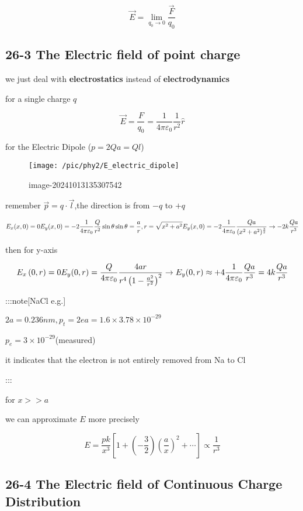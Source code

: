 \documentclass[
]{article}
\begin{document}
\[
\vec E=\lim _{q_0\to 0}\frac{\vec F}{q_0}
\]

\hypertarget{the-electric-field-of-point-charge}{%
\subsection{26-3 The Electric field of point
charge}\label{the-electric-field-of-point-charge}}

we just deal with \textbf{electrostatics} instead of
\textbf{electrodynamics}

for a single charge \(q\)

\[
\vec E=\frac{F}{q_0}=\frac{1}{4\pi \varepsilon  _0}\frac{1}{r^2}\hat r
\]

for the Electric Dipole (\(p=2Qa=Ql\))

\begin{figure}
\centering
\texttt{[image: /pic/phy2/E\_electric\_dipole]}
\caption{image-20241013135307542}
\end{figure}

remember \(\vec p=q\cdot\vec l\),the direction is from \(-q\) to \(+q\)

\[
E_x(x,0)=0\\E_y(x,0)=-2\frac{1}{4\pi \varepsilon _0}\frac{Q}{r^2}\sin \theta\\\sin \theta =\frac{a}{r},r=\sqrt{x^2+a^2}\\E_y(x,0)=-2\frac{1}{4\pi \varepsilon _0} \frac{Qa}{(x^2+a^2)^{\frac{3}{2}}}\to-2k\frac{Qa}{r^3}
\]

then for y-axis

\[
E_x\left(0,r\right)=0\\E_y(0,r)=\frac{Q}{4\pi\varepsilon_0}\frac{4ar}{r^4\left(1-\frac{a^2}{r^2}\right)^2}\to E_y(0,r)\approx+4\frac1{4\pi\varepsilon_0}\frac{Qa}{r^3}=4k\frac{Qa}{r^3}
\]

:::note{[}NaCl e.g.{]}

\(2a=0.236nm,p_t=2ea=1.6\times 3.78\times 10^{-29}\)

\(p_e=3\times 10^{-29}\)(measured)

it indicates that the electron is not entirely removed from Na to Cl

:::

for \(x>>a\)

we can approximate \(E\) more precisely

\[
E=\frac{pk}{x^3}[1+(-\frac{3}{2})(\frac{a}{x})^2+\cdots ]\propto \frac{1}{r^3}
\]

\hypertarget{the-electric-field-of-continuous-charge-distribution}{%
\subsection{26-4 The Electric field of Continuous Charge
Distribution}\label{the-electric-field-of-continuous-charge-distribution}}
\end{document}
